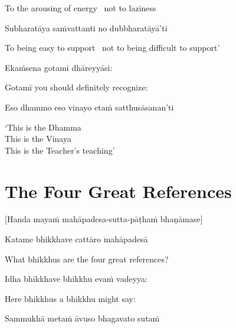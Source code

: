 \begin{english}
  To the arousing of energy \breathmark\ not to laziness
\end{english}

Subharatāya saṁvattanti no dubbharatāyā’ti

\begin{english}
  To being easy to support \breathmark\ not to being difficult to support’
\end{english}

Ekaṁsena gotami dhāreyyāsi:

\begin{english}
  Gotamī
  you should definitely recognize:
\end{english}

Eso dhammo eso vinayo etaṁ satthusāsanan’ti

\begin{english}
  ‘This is the Dhamma\\
  This is the Vinaya\\
  This is the Teacher’s teaching’
\end{english}

\suttaRef{[AN 8.53]}


\section{The Four Great References}
\label{four-great-references}

\begin{center}
  [Handa mayaṁ mahāpadesa-sutta-pāṭhaṁ bhaṇāmase]
\end{center}

Katame bhikkhave cattāro mahāpadesā

\begin{english}
  What bhikkhus are the four great references?
\end{english}

Idha bhikkhave bhikkhu evaṁ vadeyya:

\begin{english}
  Here bhikkhus a bhikkhu might say:
\end{english}

Sammukhā metaṁ āvuso bhagavato sutaṁ

